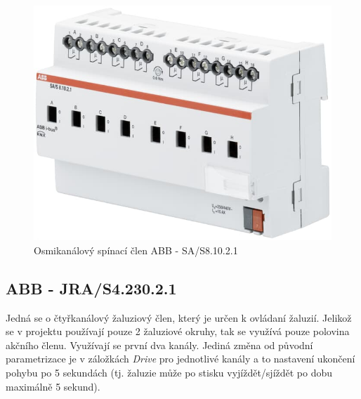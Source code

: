 \begin{figure}[!ht]
  \begin{center}
    \includegraphics[scale=0.25]{obrazky/ABB aktor1.jpg}
  \end{center}
  \caption[Osmikanálový spínací člen ABB - SA/S8.10.2.1 \cite{ABB aktor1}]{Osmikanálový spínací člen ABB - SA/S8.10.2.1  \cite{ABB aktor1}}
  \label{fig:Osmikanálový spínací člen ABB - SA/S8.10.2.1}
\end{figure}

\subsection{ABB - JRA/S4.230.2.1}
Jedná se o čtyřkanálový žaluziový člen, který je určen k ovládaní žaluzií. Jelikož se v projektu používají pouze 2 žaluziové okruhy, tak se využívá pouze polovina akčního členu. Využívají se první dva kanály. Jediná změna od původní parametrizace je v záložkách \textit{Drive} pro jednotlivé kanály a to nastavení ukončení pohybu po 5 sekundách (tj. žaluzie může po stisku vyjíždět/sjíždět po dobu maximálně 5 sekund). 

